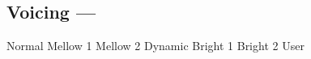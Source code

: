 \subsection[Voicing]{Voicing --- \UiKey{\I}\UiKey{\SET}}









































Normal
Mellow 1
Mellow 2
Dynamic
Bright 1
Bright 2
User
